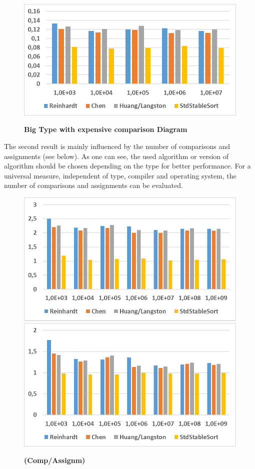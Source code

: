 \documentclass[11pt,pdftex,a4paper, twocolumn]{article}
\begin{document}
\begin{figure}[H]
\includegraphics[width=\linewidth]{Diagramm-Bilder/big-beidesTeuer.JPG} \\
\caption{\textbf{Big Type with expensive comparison Diagram}} \label{fig:big-beides-Teuer}
\end{figure}
The second result is mainly influenced by the number of comparisons and assignments (see below). As one can see, the used algorithm or version of algorithm should be chosen depending on the type for better performance. For a universal measure, independent of type, compiler and operating system, the number of comparisons and assignments can be evaluated. \\
\begin{figure}[H]
\includegraphics[width=\linewidth]{Diagramm-Bilder/ints-assignments.JPG} \\
\includegraphics[width=\linewidth]{Diagramm-Bilder/ints-comparisons.JPG} \\
\caption{\textbf{(Comp/Assignm)}} \label{fig:ints-assignAndComp}
\end{figure}
\end{document}
